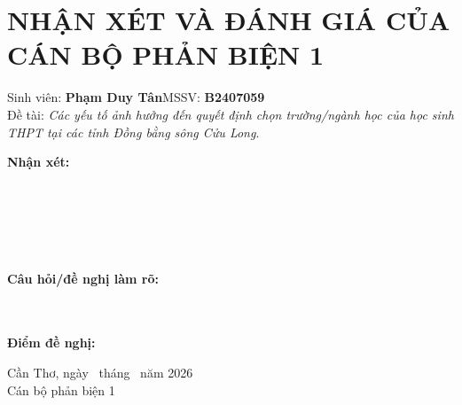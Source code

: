 \chapter*{NHẬN XÉT VÀ ĐÁNH GIÁ CỦA CÁN BỘ PHẢN BIỆN 1}\thispagestyle{empty}
\noindent Sinh viên: \textbf{Phạm Duy Tân}\hfill MSSV: \textbf{B2407059}\\
\noindent Đề tài: \textit{Các yếu tố ảnh hưởng đến quyết định chọn trường/ngành học của học sinh THPT tại các tỉnh Đồng bằng sông Cửu Long}.
\vspace{0.6cm}

\noindent\textbf{Nhận xét:}\\[0.3cm]
\dotfill\\[0.55cm]\dotfill\\[0.55cm]\dotfill\\[0.55cm]\dotfill\\[0.55cm]\dotfill\\[0.55cm]\dotfill

\noindent\textbf{Câu hỏi/đề nghị làm rõ:}\\[0.3cm]
\dotfill\\[0.55cm]\dotfill\\[0.55cm]\dotfill

\noindent\textbf{Điểm đề nghị:} \dotfill
\vfill
\begin{flushright}Cần Thơ, ngày \dotfill\ tháng \dotfill\ năm 2026\\Cán bộ phản biện 1\\[2cm]\dotfill\end{flushright}
